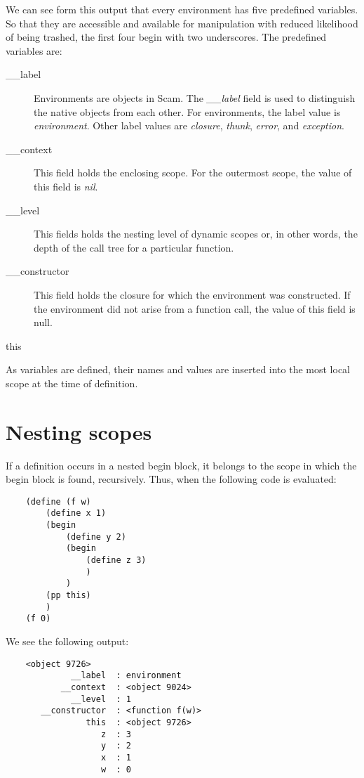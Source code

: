 We can see form this output that every environment
has five predefined variables. So that they are accessible
and available for manipulation with reduced
likelihood of being trashed, the first four begin with
two underscores. The predefined variables are:

\begin{description}
\item[\_\_label]
    Environments are objects in Scam.
    The {\it \_\_label} field is used to distinguish the native objects from
    each other. For environments, the label value is {\it environment}.
    Other label values are {\it closure}, {\it thunk}, {\it error},
    and {\it exception}.
\item[\_\_context]
    This field holds the enclosing scope. For the outermost scope,
    the value of this field is {\it nil}.
\item[\_\_level]
    This fields holds the nesting level of dynamic scopes or, in 
    other words, the depth of the call tree for a particular function.
\item[\_\_constructor]
    This field holds the closure for which the environment was constructed.
    If the environment did not arise from a function call, the value of
    this field is null.
\item[this]
\end{description}


As variables are defined, their names and values are inserted
into the most local scope at the time of definition.

\section{Nesting scopes}

If a definition occurs in 
a nested begin block, it belongs to the scope in which the
begin block is found, recursively. Thus, when the following
code is evaluated:

\begin{verbatim}
    (define (f w)
        (define x 1)
        (begin
            (define y 2)
            (begin
                (define z 3)
                )
            )
        (pp this)
        )
    (f 0)
\end{verbatim}

We see the following output:

\begin{verbatim}
    <object 9726>
             __label  : environment
           __context  : <object 9024>
             __level  : 1
       __constructor  : <function f(w)>
                this  : <object 9726>
                   z  : 3
                   y  : 2
                   x  : 1
                   w  : 0
\end{verbatim}


